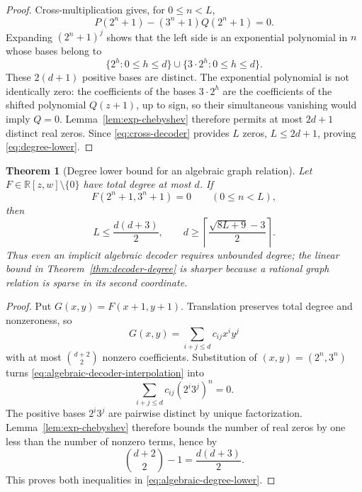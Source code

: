 \documentclass[11pt,oneside]{article}
\newtheorem{theorem}{Theorem}[section]
\theoremstyle{definition}
\theoremstyle{remark}
\newcommand{\R}{\mathbb{R}}
\newcommand{\ceil}[1]{\left\lceil #1\right\rceil}
\begin{document}
\begin{proof}
Cross-multiplication gives, for \(0\leq n<L\),
\begin{equation}\label{eq:cross-decoder}
 P(2^n+1)-(3^n+1)Q(2^n+1)=0.
\end{equation}
Expanding \((2^n+1)^j\) shows that the left side is an exponential polynomial in \(n\) whose bases belong to
\begin{equation}\label{eq:decoder-bases}
 \{2^h:0\leq h\leq d\}\cup\{3\cdot2^h:0\leq h\leq d\}.
\end{equation}
These \(2(d+1)\) positive bases are distinct.  The exponential polynomial is not identically zero: the coefficients of the bases \(3\cdot2^h\) are the coefficients of the shifted polynomial \(Q(z+1)\), up to sign, so their simultaneous vanishing would imply \(Q=0\).  Lemma~\ref{lem:exp-chebyshev} therefore permits at most \(2d+1\) distinct real zeros.  Since \eqref{eq:cross-decoder} provides \(L\) zeros, \(L\leq2d+1\), proving \eqref{eq:degree-lower}.
\end{proof}

\begin{theorem}[Degree lower bound for an algebraic graph relation]\label{thm:algebraic-decoder-degree}
Let \(F\in\R[z,w]\setminus\{0\}\) have total degree at most \(d\).  If
\begin{equation}\label{eq:algebraic-decoder-interpolation}
 F(2^n+1,3^n+1)=0\qquad(0\leq n<L),
\end{equation}
then
\begin{equation}\label{eq:algebraic-degree-lower}
 L\leq\frac{d(d+3)}2,
 \qquad
 d\geq\ceil{\frac{\sqrt{8L+9}-3}{2}}.
\end{equation}
Thus even an implicit algebraic decoder requires unbounded degree; the linear bound in Theorem~\ref{thm:decoder-degree} is sharper because a rational graph relation is sparse in its second coordinate.
\end{theorem}

\begin{proof}
Put \(G(x,y)=F(x+1,y+1)\).  Translation preserves total degree and nonzeroness, so
\[
 G(x,y)=\sum_{i+j\leq d}c_{ij}x^iy^j
\]
with at most \(\binom{d+2}{2}\) nonzero coefficients.  Substitution of \((x,y)=(2^n,3^n)\) turns \eqref{eq:algebraic-decoder-interpolation} into
\[
 \sum_{i+j\leq d}c_{ij}(2^i3^j)^n=0.
\]
The positive bases \(2^i3^j\) are pairwise distinct by unique factorization.  Lemma~\ref{lem:exp-chebyshev} therefore bounds the number of real zeros by one less than the number of nonzero terms, hence by
\[
 \binom{d+2}{2}-1=\frac{d(d+3)}2.
\]
This proves both inequalities in \eqref{eq:algebraic-degree-lower}.
\end{proof}
\end{document}
